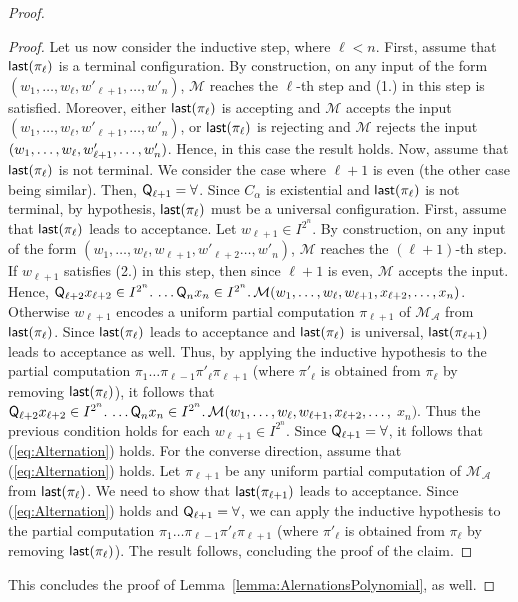 \begin{proof}
\begin{proof}
Let us now consider the inductive step, where $\ell<n$. First, assume that $\text{{\sffamily last}}(\pi_\ell)$ is a terminal configuration. By construction, on any input of the form
$(w_1,\ldots,w_\ell,w'_{\ell+1},\ldots,w'_n)$, $\mathcal{M}$ reaches the $\ell$-th step and (1.) in this step is satisfied. Moreover,
either $\text{{\sffamily last}}(\pi_\ell)$ is accepting and $\mathcal{M}$ accepts the input  $(w_1,\ldots,w_\ell,\allowbreak w'_{\ell+1},\ldots,w'_n)$, or
$\text{{\sffamily last}}(\pi_\ell)$ is rejecting and $\mathcal{M}$ rejects the input  $(w_1,\ldots,w_\ell,\linebreak w'_{\ell+1},\ldots,w'_n)$. Hence, in this case the result holds.
Now, assume that $\text{{\sffamily last}}(\pi_\ell)$ is not terminal. We consider the case where $\ell+1$ is even (the other case being similar).
Then, $\text{{\sffamily Q}}_{\ell+1}=\forall$. Since $C_\alpha$ is existential and $\text{{\sffamily last}}(\pi_\ell)$ is not terminal, by hypothesis,
  $\text{{\sffamily last}}(\pi_\ell)$ must be a universal configuration. First, assume that $\text{{\sffamily last}}(\pi_\ell)$ leads to acceptance. Let $w_{\ell+1}\in I^{2^{n}}$. By construction, on any input of the form
$(w_1,\ldots,w_\ell,w_{\ell+1},w'_{\ell+2}\ldots,w'_n)$, $\mathcal{M}$ reaches the $(\ell+1)$-th step. If $w_{\ell+1}$ satisfies (2.) in this step, then since $\ell+1$ is even, $\mathcal{M}$ accepts the input. Hence, $\text{{\sffamily Q}}_{\ell+2} x_{\ell+2}\in I^{2^{n}}.\, \ldots \text{{\sffamily Q}}_n x_n\in I^{2^{n}}. \, \mathcal{M}(w_1,\ldots,w_\ell,w_{\ell+1},x_{\ell+2},\ldots,x_n)$.
  Otherwise $w_{\ell+1}$ encodes a uniform partial computation $\pi_{\ell+1}$ of  $\mathcal{M}_{\mathcal{A}}$ from
$\text{{\sffamily last}}(\pi_\ell)$. Since $\text{{\sffamily last}}(\pi_\ell)$ leads to acceptance and $\text{{\sffamily last}}(\pi_\ell)$ is universal, $\text{{\sffamily last}}(\pi_{\ell+1})$ leads to acceptance as well. Thus, by applying the inductive hypothesis to the partial computation $\pi_1\ldots \pi_{\ell-1}\pi'_\ell \pi_{\ell+1}$ (where $\pi'_\ell$ is obtained from $\pi_\ell$ by removing $\text{{\sffamily last}}(\pi_\ell)$), it follows that $\text{{\sffamily Q}}_{\ell+2} x_{\ell+2}\in I^{2^{n}}.\, \ldots \text{{\sffamily Q}}_n x_n\in I^{2^{n}}. \, \mathcal{M}(w_1,\ldots,w_\ell,w_{\ell+1},x_{\ell+2},\ldots,$ $x_n)$. Thus the previous condition holds for each $w_{\ell+1}\in  I^{2^{n}}$. Since $\text{{\sffamily Q}}_{\ell+1}=\forall$, it follows that (\ref{eq:Alternation}) holds. For the converse direction, assume that (\ref{eq:Alternation}) holds. Let $\pi_{\ell+1}$ be any
uniform partial computation  of  $\mathcal{M}_{\mathcal{A}}$ from
$\text{{\sffamily last}}(\pi_\ell)$. We need to show that $\text{{\sffamily last}}(\pi_{\ell+1})$ leads to acceptance.  Since (\ref{eq:Alternation}) holds and $\text{{\sffamily Q}}_{\ell+1}=\forall$, we can apply the inductive hypothesis to the partial computation $\pi_1\ldots \pi_{\ell-1}\pi'_\ell \pi_{\ell+1}$ (where $\pi'_\ell$ is obtained from $\pi_\ell$ by removing $\text{{\sffamily last}}(\pi_\ell)$). The result follows,
 concluding the proof of the claim.
\end{proof} 
 
This concludes the proof of Lemma~\ref{lemma:AlernationsPolynomial}, as well.
\end{proof}

